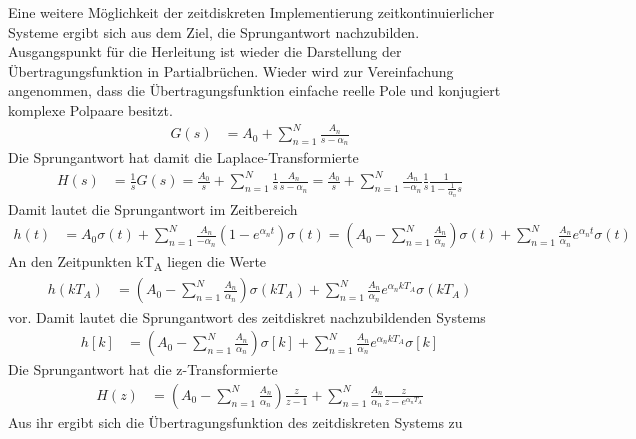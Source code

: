 Eine weitere Möglichkeit der zeitdiskreten Implementierung zeitkontinuierlicher Systeme ergibt sich aus dem Ziel, die Sprungantwort nachzubilden. Ausgangspunkt für die Herleitung ist wieder die Darstellung der Übertragungsfunktion in Partialbrüchen. Wieder wird zur Vereinfachung angenommen, dass die Übertragungsfunktion einfache reelle Pole und konjugiert komplexe Polpaare besitzt.
\begin{align}
G(s) &= A_{0} + \sum\limits_{n = 1}^{N}\frac{A_{n}}{s - \alpha_{n}} \label{eq:9.12}
\end{align}
Die Sprungantwort hat damit die Laplace-Transformierte
\begin{align}
H(s) &= \frac{1}{s}  G(s) = \frac{A_{0}}{s} + \sum\limits_{n = 1}^{N}{\frac{1}{s}  \frac{A_{n}}{s - \alpha_{n}}} = \frac{A_{0}}{s} + \sum\limits_{n = 1}^{N}{\frac{A_{n}}{- \alpha_{n}}  \frac{1}{s}  \frac{1}{1 - \frac{1}{\alpha_{n}}  s}} \label{eq:9.13}
\end{align}
Damit lautet die Sprungantwort im Zeitbereich
\begin{align}
h(t) &= A_{0}  \sigma(t) + \sum\limits_{n = 1}^{N}{\frac{A_{n}}{- \alpha_{n}}  \left( 1 - e^{\alpha_{n}  t} \right)  \sigma(t)} = \left( A_{0} - \sum\limits_{n = 1}^{N}\frac{A_{n}}{\alpha_{n}} \right)  \sigma(t) + \sum\limits_{n = 1}^{N}{\frac{A_{n}}{\alpha_{n}}  e^{\alpha_{n}  t}  \sigma(t)} \label{eq:9.14}
\end{align}
An den Zeitpunkten kT\textsubscript{A} liegen die Werte
\begin{align}
h\left( k  T_{A} \right) &= \left( A_{0} - \sum\limits_{n = 1}^{N}\frac{A_{n}}{\alpha_{n}} \right)  \sigma\left( k  T_{A} \right) + \sum\limits_{n = 1}^{N}{\frac{A_{n}}{\alpha_{n}}  e^{\alpha_{n}  k  T_{A}}  \sigma\left( k  T_{A} \right)} \label{eq:9.15}
\end{align}
vor. Damit lautet die Sprungantwort des zeitdiskret nachzubildenden Systems
\begin{align}
h[ k] &= \left( A_{0} - \sum\limits_{n = 1}^{N}\frac{A_{n}}{\alpha_{n}} \right)  \sigma[ k] + \sum\limits_{n = 1}^{N}{\frac{A_{n}}{\alpha_{n}}  e^{\alpha_{n}  k  T_{A}}  \sigma[ k]} \label{eq:9.16}
\end{align}
Die Sprungantwort hat die z-Transformierte
\begin{align}
H(z) &= \left( A_{0} - \sum\limits_{n = 1}^{N}\frac{A_{n}}{\alpha_{n}} \right)  \frac{z}{z - 1} + \sum\limits_{n = 1}^{N}{\frac{A_{n}}{\alpha_{n}}  \frac{z}{z - e^{\alpha_{n}  T_{A}}}} \label{eq:9.17}
\end{align}
Aus ihr ergibt sich die Übertragungsfunktion des zeitdiskreten Systems zu
